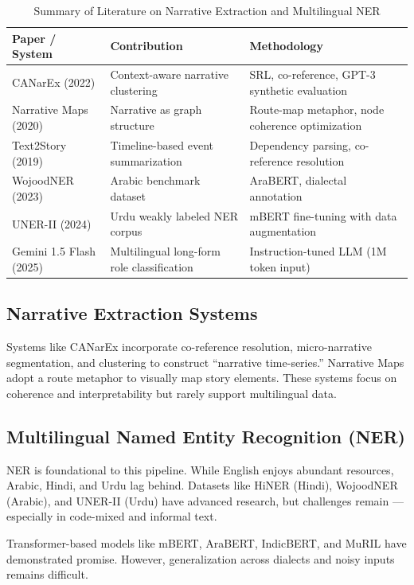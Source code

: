 \documentclass[12pt]{article}
\begin{document}
\begin{table}[H]
\centering
\begin{tabular}{p{4.2cm}p{6.8cm}p{3.5cm}}
\toprule
\textbf{Paper / System} & \textbf{Contribution} & \textbf{Methodology} \\
\midrule
CANarEx (2022) & Context-aware narrative clustering & SRL, co-reference, GPT-3 synthetic evaluation \\
Narrative Maps (2020) & Narrative as graph structure & Route-map metaphor, node coherence optimization \\
Text2Story (2019) & Timeline-based event summarization & Dependency parsing, co-reference resolution \\
WojoodNER (2023) & Arabic benchmark dataset & AraBERT, dialectal annotation \\
UNER-II (2024) & Urdu weakly labeled NER corpus & mBERT fine-tuning with data augmentation \\
Gemini 1.5 Flash (2025) & Multilingual long-form role classification & Instruction-tuned LLM (1M token input) \\
\bottomrule
\end{tabular}
\caption{Summary of Literature on Narrative Extraction and Multilingual NER}
\end{table}


\subsection{Narrative Extraction Systems}

Systems like CANarEx incorporate co-reference resolution, micro-narrative segmentation, and clustering to construct “narrative time-series.” Narrative Maps adopt a route metaphor to visually map story elements. These systems focus on coherence and interpretability but rarely support multilingual data.

\subsection{Multilingual Named Entity Recognition (NER)}

NER is foundational to this pipeline. While English enjoys abundant resources, Arabic, Hindi, and Urdu lag behind. Datasets like HiNER (Hindi), WojoodNER (Arabic), and UNER-II (Urdu) have advanced research, but challenges remain — especially in code-mixed and informal text.

Transformer-based models like mBERT, AraBERT, IndicBERT, and MuRIL have demonstrated promise. However, generalization across dialects and noisy inputs remains difficult.
\end{document}
